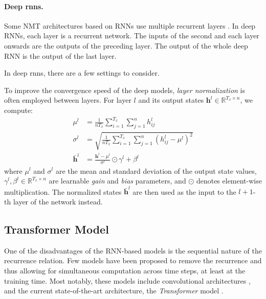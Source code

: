 \paragraph{Deep \acp{rnn}.} Some NMT architectures based on RNNs use multiple
recurrent layers \citep{miceli-barone-etal-2017-deep,wu2016google}. In deep
RNNs, each layer is a recurrent network. The inputs of the second and each
layer onwards are the outputs of the preceding layer. The output of the whole
deep RNN is the output of the last layer.

In deep \acp{rnn}, there are a few settings to consider. 

  To improve the convergence
speed of the deep models, \emph{layer normalization} \citep{ba2016layer} is
often employed between layers. For layer $l$ and its output states
$\mathbf{h}^l \in \mathbb{R}^{T_x \times n}$, we compute:
%
\begin{align}
  \mu^l &= \frac{1}{nT_x} \sum_{i=1}^{T_x}\sum_{j=1}^n h^l_{ij} \\
  \sigma^l &= \sqrt{\frac{1}{nT_x} \sum_{i=1}^{T_x}\sum_{j=1}^n (h^l_{ij} - \mu^l)^2} \\
  \bar{\mathbf{h}}^l &= \frac{\mathbf{h}^l - \mu^l}{\sigma^l} \odot \gamma^l + \beta^l
\end{align}
%
where $\mu^l$ and $\sigma^l$ are the mean and standard deviation of the output
state values, $\gamma^l, \beta^l \in \mathbb{R}^{T_x \times n}$ are learnable
\emph{gain} and \emph{bias} parameters, and $\odot$ denotes element-wise
multiplication. The normalized states $\bar{\mathbf{h}}^l$ are then used as the
input to the $l+1$-th layer of the network instead.




\subsection{Transformer Model}
\label{sec:encdec:transformer}

One of the disadvantages of the RNN-based models is the sequential nature of
the recurrence relation. Few models have been proposed to remove the recurrence
and thus allowing for simultaneous computation across time steps, at least at
the training time. Most notably, these models include convolutional
architectures \citep{gehring2017convolutional}, and the current
state-of-the-art architecture, the \emph{Transformer} model
\citep{vaswani2017attention}.

